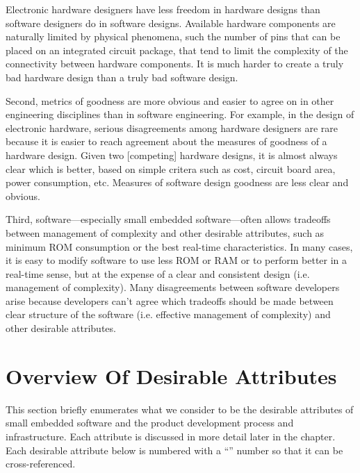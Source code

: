 Electronic hardware designers have less freedom in hardware designs than software
designers do in software designs.  Available hardware components are
naturally limited by physical phenomena, such the number of pins
that can be placed on an integrated circuit package, that tend to
limit the complexity of the connectivity between hardware components.
It is much harder
to create a truly bad hardware design than a truly bad software design.

Second, metrics of goodness are more obvious and easier to agree
on in other engineering disciplines than in software engineering.
For example, in the design of electronic hardware, serious disagreements 
among hardware
designers are rare because it is easier to reach agreement about the
measures of goodness of a hardware design.  Given two [competing] hardware
designs, it is almost always clear which is better, based on simple
critera such as cost, circuit board area, power consumption, etc.
Measures of software design goodness are less clear and obvious.

Third, software---especially small embedded software---often allows
tradeoffs between management of complexity and other desirable
attributes, such as minimum ROM consumption or the best real-time
characteristics.  In many cases, it is easy to modify software
to use less ROM or RAM or to perform better in a real-time sense,
but at the expense of a clear and consistent design (i.e. management of
complexity).
Many disagreements between software developers
arise because developers can't agree which tradeoffs should be
made between
clear structure of the software (i.e. effective management of complexity)
and other desirable attributes.


\section{Overview Of Desirable Attributes}
\label{chgr0:soda0}

This section briefly enumerates what we consider to be the desirable
attributes of small embedded software and the product development
process and infrastructure.  Each attribute is discussed in more
detail later in the chapter.  Each desirable attribute below is 
numbered with a ``\desirablepropertyprefix'' number so that it
can be cross-referenced.

